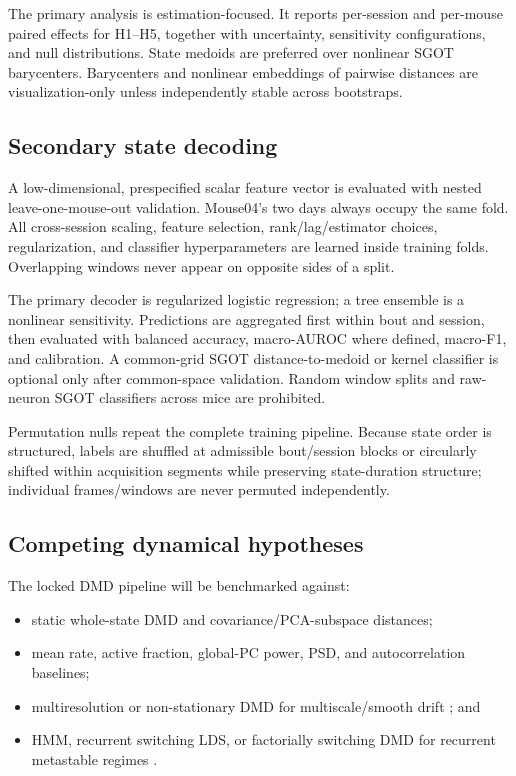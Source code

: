 \documentclass[11pt,a4paper]{article}
\begin{document}
The primary analysis is estimation-focused. It reports per-session and per-mouse paired effects for H1--H5, together with uncertainty, sensitivity configurations, and null distributions. State medoids are preferred over nonlinear SGOT barycenters. Barycenters and nonlinear embeddings of pairwise distances are visualization-only unless independently stable across bootstraps.

\subsection{Secondary state decoding}

A low-dimensional, prespecified scalar feature vector is evaluated with nested leave-one-mouse-out validation. Mouse04's two days always occupy the same fold. All cross-session scaling, feature selection, rank/lag/estimator choices, regularization, and classifier hyperparameters are learned inside training folds. Overlapping windows never appear on opposite sides of a split.

The primary decoder is regularized logistic regression; a tree ensemble is a nonlinear sensitivity. Predictions are aggregated first within bout and session, then evaluated with balanced accuracy, macro-AUROC where defined, macro-F1, and calibration. A common-grid SGOT distance-to-medoid or kernel classifier is optional only after common-space validation. Random window splits and raw-neuron SGOT classifiers across mice are prohibited.

Permutation nulls repeat the complete training pipeline. Because state order is structured, labels are shuffled at admissible bout/session blocks or circularly shifted within acquisition segments while preserving state-duration structure; individual frames/windows are never permuted independently.

\subsection{Competing dynamical hypotheses}

The locked DMD pipeline will be benchmarked against:

\begin{itemize}
  \item static whole-state DMD and covariance/PCA-subspace distances;
  \item mean rate, active fraction, global-PC power, PSD, and autocorrelation baselines;
  \item multiresolution or non-stationary DMD for multiscale/smooth drift \citep{kutz2016mrdmd,ferre2023}; and
  \item HMM, recurrent switching LDS, or factorially switching DMD for recurrent metastable regimes \citep{linderman2017,takeishi2018switching,stevner2019,hudson2014}.
\end{itemize}
\end{document}
